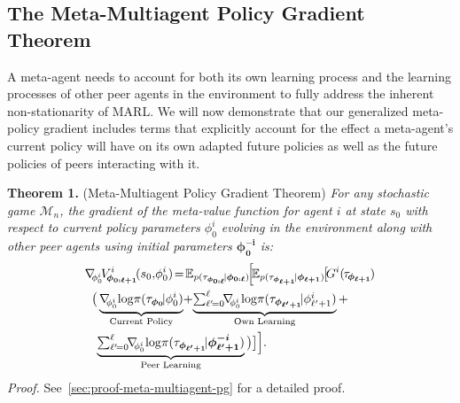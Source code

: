 \subsection{The Meta-Multiagent Policy Gradient Theorem}\label{sec:meta-mapg-theorem}
A meta-agent needs to account for both its own learning process and the learning processes of other peer agents in the environment to fully address the inherent non-stationarity of MARL. 
We will now demonstrate that our generalized meta-policy gradient includes terms that explicitly account for the effect a meta-agent's current policy will have on its own adapted future policies as well as the future policies of peers interacting with it.

\textbf{Theorem 1.} (Meta-Multiagent Policy Gradient Theorem) \textit{For any stochastic game $\mathcal{M}_{n}$, the gradient of the meta-value function for agent $i$ at state $s_0$ with respect to current policy parameters $\phi_0^i$ evolving in the environment along with other peer agents using initial parameters $\bm{\phi}_{\bm{0}}^{\bm{-i}}$ is:}
\begin{align}\label{eqn:meta-multiagent-policy-gradient}
\begin{split}
&\nabla_{\!\!\phi^{i}_{0}}\!V^{i}_{\!\bm{\phi}_{\bm{0:\ell+1}}}\!(s_0,\!\phi^{i}_{0})\!=\!\mathbb{E}_{p(\tau_{\bm{\phi}_{\bm{0:\ell}}}\!|\bm{\phi}_{\bm{0:\ell}})}\!\Big[\!\mathbb{E}_{p(\tau_{\bm{\phi}_{\bm{\ell+1}}}\!|\bm{\phi}_{\bm{\ell+1}})}\!\big[\!G^{i}(\hspace{-0.1em}\tau_{\hspace{-0.1em}\bm{\phi}_{\bm{\ell+1}}}\hspace{-0.1em})\\
&\;\;\big(\underbrace{\nabla_{\!\!\phi^{i}_{0}}\!\log\!\pi(\tau_{\bm{\phi}_{\bm{0}}}\!|\phi^{i}_{0})}_{\text{Current Policy}}\!+\!\underbrace{\smallsum\nolimits_{\ell'\!=0}^{\ell}\!\!\nabla_{\!\!\phi^{i}_{0}}\!\log\!\pi(\tau_{\bm{\phi}_{\bm{\ell'+1}}}\!|\phi^{i}_{\ell'+1})}_{\text{Own Learning}}+\\
&\;\;\;\underbrace{\smallsum\nolimits_{\ell'\!=0}^{\ell}\!\!\nabla_{\!\!\phi^{i}_{0}}\!\log\!\pi(\tau_{\bm{\phi}_{\bm{\ell'+1}}}\!|\bm{\phi}^{\bm{-i}}_{\bm{\ell'+1}})}_{\text{Peer Learning}}\big)\big]\Big].
\raisetag{63pt}
\end{split}
\end{align}
\textit{Proof.} \hspace{0.2em}See~\cref{sec:proof-meta-multiagent-pg} for a detailed proof.\QEDB

